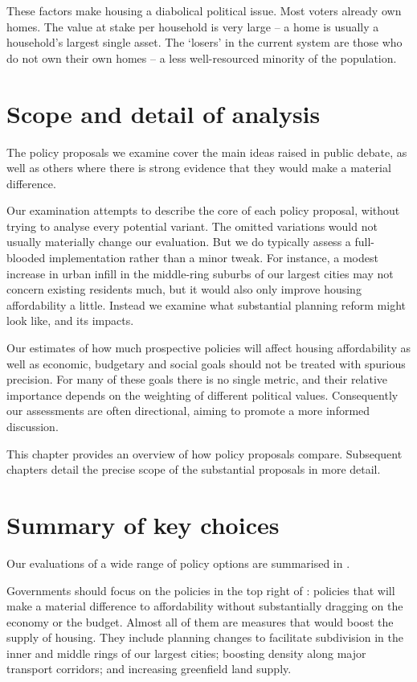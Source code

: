 These factors make housing a diabolical political issue.
Most voters already own homes.
The value at stake per household is very large -- a home is usually a household's largest single asset.
The `losers' in the current system are those who do not own their own homes -- a less well-resourced minority of the population.

\section{Scope and detail of analysis}\label{sec:scope-and-detail-of-analysis}

The policy proposals we examine cover the main ideas raised in public debate, as well as others where there is strong evidence that they would make a material difference.

Our examination attempts to describe the core of each policy proposal, without trying to analyse every potential variant.
The omitted variations would not usually materially change our evaluation.
But we do typically assess a full-blooded implementation rather than a minor tweak.
For instance, a modest increase in urban infill in the middle-ring suburbs of our largest cities may not concern existing residents much, but it would also only improve housing affordability a little.
Instead we examine what substantial planning reform might look like, and its impacts.

Our estimates of how much prospective policies will affect housing affordability as well as economic, budgetary and social goals should not be treated with spurious precision.
For many of these goals there is no single metric, and their relative importance depends on the weighting of different political values.
Consequently our assessments are often directional, aiming to promote a more informed discussion.

This chapter provides an overview of how policy proposals compare.
Subsequent chapters detail the precise scope of the substantial proposals in more detail.

\section{Summary of key choices}\label{sec:summary-of-key-choices}

Our evaluations of a wide range of policy options are summarised in .

Governments should focus on the policies in the top right of : policies that will make a material difference to affordability without substantially dragging on the economy or the budget.
Almost all of them are measures that would boost the supply of housing.
They include planning changes to facilitate subdivision in the inner and middle rings of our largest cities; boosting density along major transport corridors; and increasing greenfield land supply.

